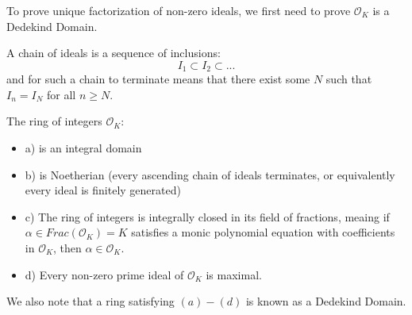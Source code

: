 \noindent To prove unique factorization of non-zero ideals, we first need to prove $\mathcal{O}_K$ is a Dedekind Domain.

\begin{definition}
A chain of ideals is a sequence of inclusions:
\[I_1 \subset I_2 \subset ...\]
and for such a chain to terminate means that there exist some $N$ such that $I_n = I_N$ for all $n \geq N$.
\end{definition}

\begin{theorem}[pg. 109 - S + T]
The ring of integers $\mathcal{O}_K$:
\begin{itemize}
    \item a) is an integral domain
    \item b) is Noetherian (every ascending chain of ideals terminates, or equivalently every ideal is finitely generated)
    \item c) The ring of integers is integrally closed in its field of fractions, meaing if $\alpha \in Frac(\mathcal{O}_K) = K$ satisfies a monic polynomial equation with coefficients in $\mathcal{O}_K$, then $\alpha \in \mathcal{O}_K$.
    \item d) Every non-zero prime ideal of $\mathcal{O}_K$ is maximal.
\end{itemize}
We also note that a ring satisfying $(a) - (d)$ is known as a Dedekind Domain.
\end{theorem}
